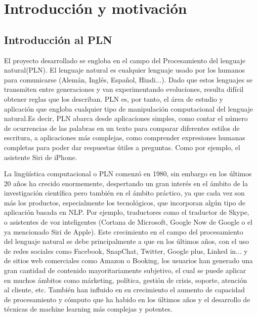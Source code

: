 \chapter{Introducción y motivación}
\label{introducción}
\section{Introducción al PLN}
El proyecto desarrollado se engloba en el campo del Procesamiento del lenguaje natural(PLN). El lenguaje natural es cualquier lenguaje usado por los humanos para comunicarse (Alemán, Inglés, Español, Hindi...). Dado que estos lenguajes se transmiten entre generaciones y van experimentando evoluciones, resulta difícil obtener reglas que los describan. PLN es, por tanto, el área de estudio y aplicación que engloba cualquier tipo de manipulación computacional del lenguaje natural.\newline Es decir, PLN abarca desde aplicaciones simples, como contar el número de ocurrencias de las palabras en un texto para comparar diferentes estilos de escritura, a aplicaciones más complejas, como comprender expresiones humanas completas para poder dar respuestas útiles a preguntas. \citet{bird2009natural} Como por ejemplo, el asistente Siri de iPhone. 

La lingüística computacional o PLN comenzó en 1980, sin embargo en los últimos 20 años ha crecido enormemente, despertando un gran interés en el ámbito de la investigación científica pero también en el ámbito práctico, ya que cada vez son más los productos, especialmente los tecnológicos, que incorporan algún tipo de aplicación basada en NLP. Por ejemplo, traductores como el traductor de Skype, o asistentes de voz inteligentes (Cortana de Microsoft, Google Now de Google o el ya mencionado Siri de Apple). \newline
Este crecimiento en el campo del procesamiento del lenguaje natural se debe principalmente a que en los últimos años, con el uso de redes sociales como Facebook, SnapChat, Twitter, Google plus, Linked in... y de sitios web comerciales como Amazon o Booking, los usuarios han generado una gran cantidad de contenido mayoritariamente subjetivo, el cual se puede aplicar en muchos ámbitos como márketing, política, gestión de crisis, soporte, atención al cliente, etc. También han influido en su crecimiento el aumento de capacidad de procesamiento y cómputo que ha habido en los últimos años y el desarrollo de técnicas de machine learning más complejas y potentes.    
\newline

